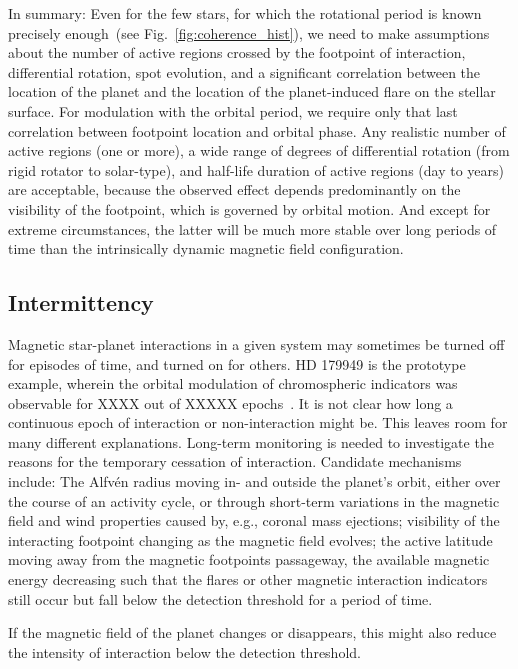 \documentclass[twocolumn]{aastex631}
\begin{document}
In summary: Even for the few stars, for which the rotational period is known precisely enough~(see Fig.~\ref{fig:coherence_hist}), we need to make assumptions about the number of active regions crossed by the footpoint of interaction, differential rotation, spot evolution, and a significant correlation between the location of the planet and the location of the planet-induced flare on the stellar surface. For modulation with the orbital period, we require only that last correlation between footpoint location and orbital phase. Any realistic number of active regions (one or more), a wide range of degrees of differential rotation (from rigid rotator to solar-type), and half-life duration of active regions (day to years) are acceptable, because the observed effect depends predominantly on the visibility of the footpoint, which is governed by orbital motion. And except for extreme circumstances, the latter will be much more stable over long periods of time than the intrinsically dynamic magnetic field configuration. 

\subsection{Intermittency}
\label{sec:discussion:intermittency}
Magnetic star-planet interactions in a given system may sometimes be turned off for episodes of time, and turned on for others. HD 179949 is the prototype example, wherein the orbital modulation of chromospheric indicators was observable for XXXX out of XXXXX epochs~\citep{shkolnik2003evidence,shkolnik2008nature}. It is not clear how long a continuous epoch of interaction or non-interaction might be. This leaves room for many different explanations. Long-term monitoring is needed to investigate the reasons for the temporary cessation of interaction. Candidate mechanisms include: The Alfv\'en radius moving in- and outside the planet's orbit, either over the course of an activity cycle, or through short-term variations in the magnetic field and wind properties caused by, e.g., coronal mass ejections; visibility of the interacting footpoint changing as the magnetic field evolves; the active latitude moving away from the magnetic footpoints passageway, the available magnetic energy decreasing such that the flares or other magnetic interaction indicators still occur but fall below the detection threshold for a period of time.

If the magnetic field of the planet changes or disappears, this might also reduce the intensity of interaction below the detection threshold.
\end{document}
